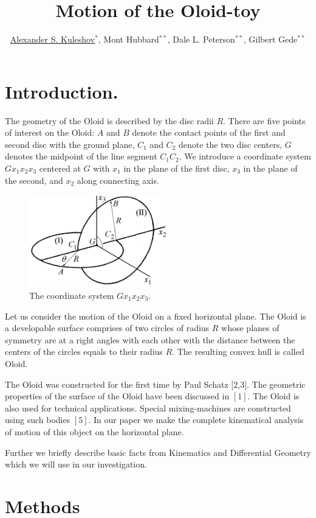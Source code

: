 \documentclass[10pt]{enoc2011}
\title{Motion of the Oloid-toy}
\author{\underline{Alexander S. Kuleshov}$^{\ast}$,
                   Mont Hubbard$^{\ast\ast}$,
                   Dale L. Peterson$^{\ast\ast}$,
                   Gilbert Gede$^{\ast\ast}$}
\begin{document}

\section*{Introduction.}

The geometry of the Oloid is described by the disc radii $R$.  There are five
points of interest on the Oloid: $A$ and $B$ denote the contact points of the
first and second disc with the ground plane, $C_1$ and $C_2$ denote the two
disc centers, $G$ denotes the midpoint of the line segment $C_1C_2$.  We
introduce a coordinate system $Gx_1x_2x_3$ centered at $G$ with $x_1$ in the
plane of the first disc, $x_3$ in the plane of the second, and $x_2$ along
connecting axis.
\begin{figure}[h]
\centering
\includegraphics[height=4cm]{Oloid2}
\caption{The coordinate system $Gx_1x_2x_3$.}
\end{figure}

Let us consider the motion of the Oloid on a fixed horizontal plane. The Oloid
is a developable surface comprises of two circles of radius $R$ whose planes of
symmetry are at a right angles with each other with the distance between the
centers of the circles equals to their radius $R$. The resulting convex hull is
called Oloid.

The Oloid was constructed for the first time by Paul Schatz $[2$,$3]$. The geometric properties of the surface of the Oloid have been discussed in $[1]$. The Oloid is also used for technical applications. Special mixing-machines are constructed using such bodies $[5]$. In our paper we make the complete kinematical analysis of motion of this object on the horizontal plane.

Further we briefly describe basic facts from Kinematics and Differential Geometry which we will use in our investigation.

\section*{Methods}
\end{document}
